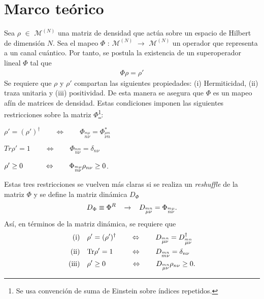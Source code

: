 \documentclass[11pt]{article}
\begin{document}
\section*{Marco teórico}
Sea $\rho$ $\in$ $\mathcal{M}^{(N)}$ una matriz de densidad que actúa sobre un espacio de Hilbert de dimensión $N$. Sea el mapeo $\Phi$ : $\mathcal{M}^{(N)}$ $\to$ $\mathcal{M}^{(N)}$ un operador que representa a un canal cuántico. Por tanto, se postula la existencia de un superoperador lineal $\Phi$ tal que
\begin{align}
	\Phi \rho = \rho '
\end{align}
Se requiere que $\rho$ y $\rho '$ compartan las siguientes propiedades: (i) Hermiticidad, (ii) traza unitaria y (iii) positividad. De esta manera se asegura que $\Phi$ es un mapeo afín de matrices de densidad. Estas condiciones imponen las siguientes restricciones sobre la matriz $\Phi$\footnote{Se usa convención de suma de Einstein sobre índices repetidos.}:
\begin{description}
\centering
	\item[(i)] $\rho ' = (\rho ')^{\dagger} \qquad \Leftrightarrow \qquad \Phi _{\stackrel{m \mu}{n \nu}} = \Phi ^{*}_{\stackrel{\mu m}{\nu n}}$
	\item[(ii)] $Tr \rho ' = 1 \qquad \Leftrightarrow \qquad \Phi _{\stackrel{m m}{n \nu}} = \delta _{n\nu}$
	\item[(iii)] $\rho ' \geq 0 \hspace{0.35cm} \qquad \Leftrightarrow \qquad \Phi _{\stackrel{m \mu}{n \nu}}\rho _{n\nu} \geq 0$.
\end{description}
Estas tres restricciones se vuelven más claras si se realiza un \textit{reshuffle} de la matriz $\Phi$ y se define la matriz dinámica $D_{\Phi}$ 
\begin{align}
	D_{\Phi} \equiv \Phi ^R		\hspace{0.3cm} \rightarrow \hspace{0.3cm} 	D_{\stackrel{m n}{\mu \nu}} = \Phi _{\stackrel{m \mu}{n \nu}}. 
\end{align} Así, en términos de la matriz dinámica, se requiere que
\begin{align}
	\text{(i)}	& \quad	\rho ' = (\rho ')^{\dagger} \qquad	\Leftrightarrow	\quad \quad	D_{\stackrel{m n}{\mu \nu}} = D ^{\dagger}_{\stackrel{m n}{\mu \nu}} \\
	\text{(ii)}	& \quad	\text{Tr} \rho ' = 1 \hspace{1.7mm} \qquad	\Leftrightarrow	\quad \quad	D_{\stackrel{m n}{m \nu}} = \delta _{n \nu} \\
	\text{(iii)}	& \quad	\rho ' \geq 0 \hspace{5.5mm} \qquad	\Leftrightarrow	\quad \quad	D_{\stackrel{m n}{\mu \nu}} \rho _{n \nu} \geq 0 . 
\end{align}
\end{document}
